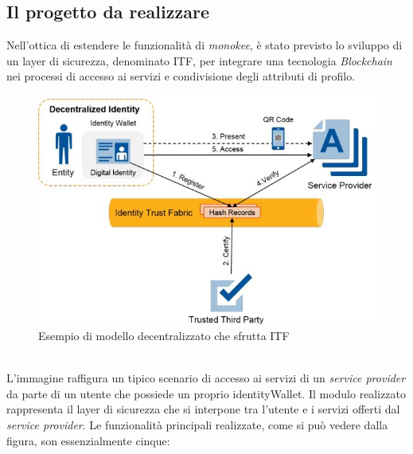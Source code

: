 \subsection{Il progetto da realizzare}
Nell'ottica di estendere le funzionalità di \emph{\gls{monokee}}\glsfirstoccur, è stato previsto lo sviluppo di un layer di sicurezza, denominato \gls{ITF}, per integrare una tecnologia \textit{Blockchain} nei processi di accesso ai servizi e condivisione degli attributi di profilo.
\begin{figure}[!h]
	\centering
	\includegraphics[scale=0.50]{immagini/ITF_Modello_Funzionale}
	\caption{Esempio di modello decentralizzato che sfrutta ITF}
\end{figure}
\\
L'immagine raffigura un tipico scenario di accesso ai servizi di un \textit{service provider} da parte di un utente che possiede un proprio \gls{identityWallet}.
Il modulo realizzato rappresenta il layer di sicurezza che si interpone tra l'utente e i servizi offerti dal \textit{service provider}.
Le funzionalità principali realizzate, come si può vedere dalla figura, son essenzialmente cinque:
